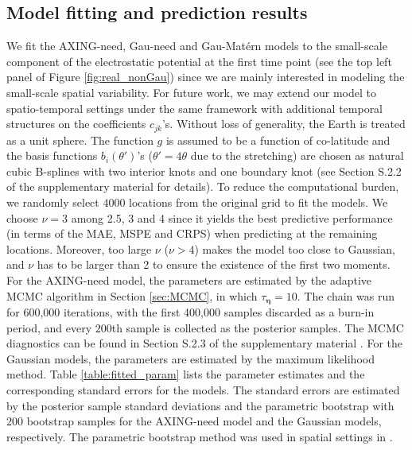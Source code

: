 \documentclass[aoas,preprint]{imsart}
\numberwithin{equation}{section}
\theoremstyle{plain}
\begin{document}
\subsection{Model fitting and prediction results}
We fit the AXING-need, Gau-need and Gau-Mat\'ern models to the small-scale component of the electrostatic potential at the first time point (see the top left panel of Figure \ref{fig:real_nonGau}) since we are mainly interested in modeling the small-scale spatial variability. For future work, we may extend our model to spatio-temporal settings under the same framework with additional temporal structures on the coefficients $c_{jk}$'s. Without loss of generality, the Earth is treated as a unit sphere.
The function $g$ is assumed to be a function of co-latitude and the basis functions $b_i(\theta')$'s ($\theta'=4\theta$ due to the stretching) are chosen as natural cubic B-splines with two interior knots and one boundary knot (see Section S.2.2 of the supplementary material \citet{Fan-17-supp} for details). To reduce the computational burden, we randomly select $4000$ locations from the original grid to fit the models. We choose $\nu=3$ among 2.5, 3 and 4 since it yields the best predictive performance (in terms of the MAE, MSPE and CRPS) when predicting at the remaining locations. Moreover, too large $\nu$ ($\nu>4$) makes the model too close to Gaussian, and $\nu$ has to be larger than 2 to ensure the existence of the first two moments. For the AXING-need model, the parameters are estimated by the adaptive MCMC algorithm in Section \ref{sec:MCMC}, in which $\tau_{\bm{\eta}}=10$. The chain was run for 600,000 iterations, with the first 400,000 samples discarded as a burn-in period, and every $200$th sample is collected as the posterior samples. The MCMC diagnostics can be found in Section S.2.3 of the supplementary material \citep{Fan-17-supp}. For the Gaussian models, the parameters are estimated by the maximum likelihood method. Table \ref{table:fitted_param} lists the parameter estimates and the corresponding standard errors for the models. The standard errors are estimated by the posterior sample standard deviations and the parametric bootstrap with $200$ bootstrap samples for the AXING-need model and the Gaussian models, respectively. The parametric bootstrap method was used in spatial settings in \citet{Xu-16, Fan-16}. %
\end{document}
